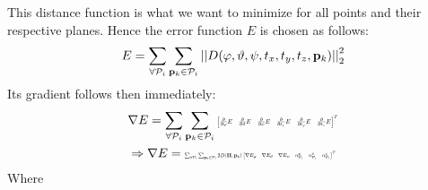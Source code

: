 This distance function is what we want to minimize for all points and their respective planes.
Hence the error function $E$ is chosen as follows:
\begin{align}
	E = \sum_{\forall \mathcal{P}_i}\sum_{\vec{p}_k \in \mathcal{P}_i} \norm[2]{D(\varphi,\vartheta,\psi,t_x,t_y,t_z, \vec{p}_k)}^2
\end{align}
Its gradient follows then immediately:
\begin{align}
	&\nabla E =  \sum_{\forall \mathcal{P}_i}\sum_{\vec{p}_k \in \mathcal{P}_i} \resizebox{0.28\textwidth}{!}{$\begin{bmatrix}\pardiff{\varphi} E&\pardiff{\vartheta} E&\pardiff{\psi} E&\pardiff{t_x} E&\pardiff{t_y} E&\pardiff{t_z} E\end{bmatrix}^T$}\\
    &\Rightarrow\nabla E = \resizebox{0.35\textwidth}{!}{$\sum_{\forall \mathcal{P}_i} \sum_{\vec{p}_k \in \mathcal{P}_i}2D(\vec{\Pi}, \vec{p}_k)\begin{bmatrix}\nabla E_\varphi &\nabla E_\vartheta & \nabla E_\psi & n_{\mathcal{P}_i}^x&n_{\mathcal{P}_i}^y&n_{\mathcal{P}_i}^z\end{bmatrix}^T$}
\end{align}
Where
